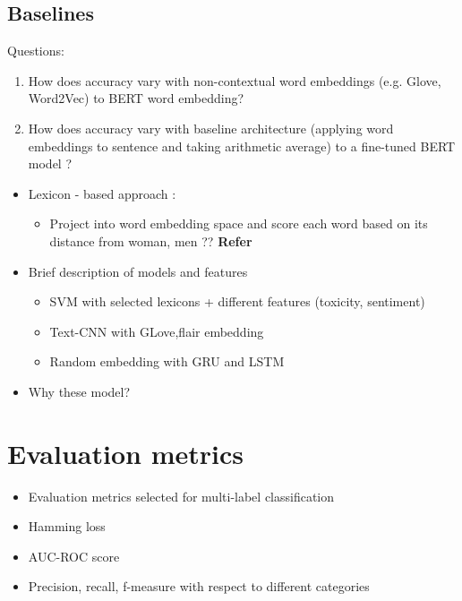 \subsection{Baselines}

Questions:

\begin{enumerate}
    \item How does accuracy vary with non-contextual word embeddings (e.g. Glove, Word2Vec) to BERT word embedding?
    \item How does accuracy vary with baseline architecture (applying word embeddings to sentence and taking arithmetic average) to a fine-tuned BERT model ?
\end{enumerate}

    \begin{itemize}
        \item Lexicon - based approach : 
        \begin{itemize}
            \item Project into word embedding space and score each word based on its distance from woman, men ??
            \textbf{Refer }\cite{cryan2020detecting}
        \end{itemize}
        \item Brief description of  models and features
        \begin{itemize}
            \item SVM with selected lexicons + different features (toxicity, sentiment)
            \item Text-CNN with GLove,flair embedding
            \item Random embedding with GRU and LSTM 
        \end{itemize}
        \item Why these model?
    \end{itemize}
\section{Evaluation metrics} \cite{tsoumakas2007multi}
    \begin{itemize}
        \item Evaluation metrics selected for multi-label classification 
        \item Hamming loss 
        \item AUC-ROC score 
        \item Precision, recall, f-measure with respect to different categories
    \end{itemize}
    